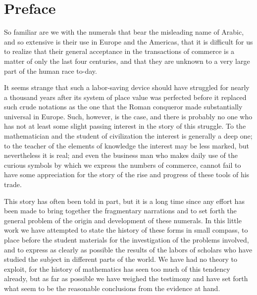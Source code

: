\documentclass[11pt,a4paper]{article}
\begin{document}
\section*{Preface}

So familiar are we with the numerals that bear the misleading name of Arabic, and so extensive is their use in Europe and the Americas, that it is difficult for us to realize that their general acceptance in the transactions of commerce is a matter of only the last four centuries, and that they are unknown to a very large part of the human race to-day.

It seems strange that such a labor-saving device should have struggled for nearly a thousand years after its system of place value was perfected before it replaced such crude notations as the one that the Roman conqueror made substantially universal in Europe. Such, however, is the case, and there is probably no one who has not at least some slight passing interest in the story of this struggle. To the mathematician and the student of civilization the interest is generally a deep one; to the teacher of the elements of knowledge the interest may be less marked, but nevertheless it is real; and even the business man who makes daily use of the curious symbols by which we express the numbers of commerce, cannot fail to have some appreciation for the story of the rise and progress of these tools of his trade.

This story has often been told in part, but it is a long time since any effort has been made to bring together the fragmentary narrations and to set forth the general problem of the origin and development of these numerals. In this little work we have attempted to state the history of these forms in small compass, to place before the student materials for the investigation of the problems involved, and to express as clearly as possible the results of the labors of scholars who have studied the subject in different parts of the world. We have had no theory to exploit, for the history of mathematics has seen too much of this tendency already, but as far as possible we have weighed the testimony and have set forth what seem to be the reasonable conclusions from the evidence at hand.
\end{document}
